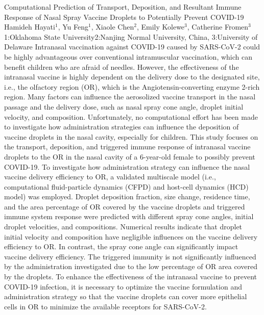 \vspace{1.5ex}
\abs
{Computational Prediction of Transport, Deposition, and Resultant Immune Response of Nasal Spray Vaccine Droplets to Potentially Prevent COVID-19} 
{Hamideh Hayati$^1$, Yu Feng$^1$, Xiaole Chen$^2$, Emily Kolewe$^3$, Catherine Fromen$^3$}
{1:Oklahoma State University2:Nanjing Normal University, China, 3:University of Delaware} 
{Intranasal vaccination against COVID-19 caused by SARS-CoV-2 could be highly advantageous over conventional intramuscular vaccination, which can benefit children who are afraid of needles. However, the effectiveness of the intranasal vaccine is highly dependent on the delivery dose to the designated site, i.e., the olfactory region (OR), which is the Angiotensin-converting enzyme 2-rich region. Many factors can influence the aerosolized vaccine transport in the nasal passage and the delivery dose, such as nasal spray cone angle, droplet initial velocity, and composition. Unfortunately, no computational effort has been made to investigate how administration strategies can influence the deposition of vaccine droplets in the nasal cavity, especially for children. This study focuses on the transport, deposition, and triggered immune response of intranasal vaccine droplets to the OR in the nasal cavity of a 6-year-old female to possibly prevent COVID-19. To investigate how administration strategy can influence the nasal vaccine delivery efficiency to OR, a validated multiscale model (i.e., computational fluid-particle dynamics (CFPD) and host-cell dynamics (HCD) model) was employed. Droplet deposition fraction, size change, residence time, and the area percentage of OR covered by the vaccine droplets and triggered immune system response were predicted with different spray cone angles, initial droplet velocities, and compositions. Numerical results indicate that droplet initial velocity and composition have negligible influences on the vaccine delivery efficiency to OR. In contrast, the spray cone angle can significantly impact vaccine delivery efficiency. The triggered immunity is not significantly influenced by the administration investigated due to the low percentage of OR area covered by the droplets. To enhance the effectiveness of the intranasal vaccine to prevent COVID-19 infection, it is necessary to optimize the vaccine formulation and administration strategy so that the vaccine droplets can cover more epithelial cells in OR to minimize the available receptors for SARS-CoV-2.}


